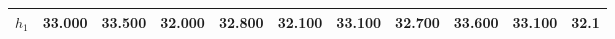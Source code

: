 
        \begin{tabular}{c|*{10}{c}}
            \hline
            \hline
                \(h_{1}\) & 33.000 & 33.500 & 32.000 & 32.800 & 32.100 & 33.100 & 32.700 & 33.600 & 33.100 & 32.1 \\
            \hline
            
            \hline
            \hline
        \end{tabular}
        